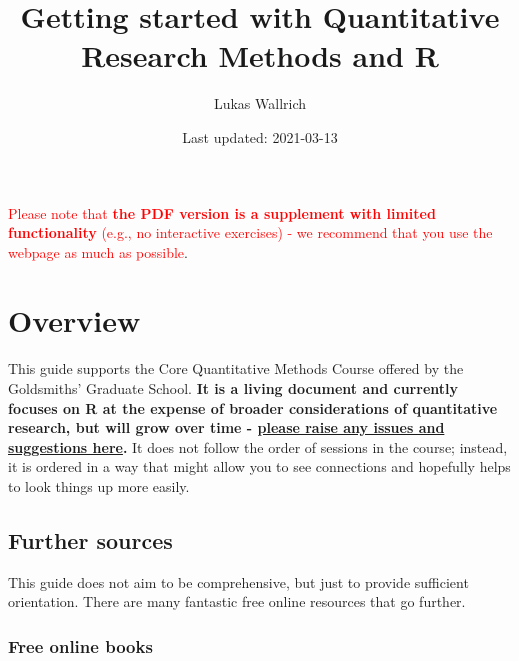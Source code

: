 \documentclass[
]{book}
\title{Getting started with Quantitative Research Methods and R}
\author{Lukas Wallrich}
\date{Last updated: 2021-03-13}
\begin{document}
\maketitle

{
\hypersetup{linkcolor=}
\setcounter{tocdepth}{1}
\tableofcontents
}
\newpage

\textcolor{red}{Please note that \textbf{the PDF version is a supplement with limited functionality} (e.g., no interactive exercises) - we recommend that you use the webpage as much as possible}.

\hypertarget{overview}{%
\chapter*{Overview}\label{overview}}

This guide supports the Core Quantitative Methods Course offered by the Goldsmiths' Graduate School. \textbf{It is a living document and currently focuses on R at the expense of broader considerations of quantitative research, but will grow over time - \href{https://github.com/LukasWallrich/GoldCoreQuants/issues}{please raise any issues and suggestions here}.} It does not follow the order of sessions in the course; instead, it is ordered in a way that might allow you to see connections and hopefully helps to look things up more easily.

\hypertarget{further-sources}{%
\section{Further sources}\label{further-sources}}

This guide does not aim to be comprehensive, but just to provide sufficient orientation. There are many fantastic free online resources that go further.

\hypertarget{free-online-books}{%
\subsection{Free online books}\label{free-online-books}}
\end{document}
